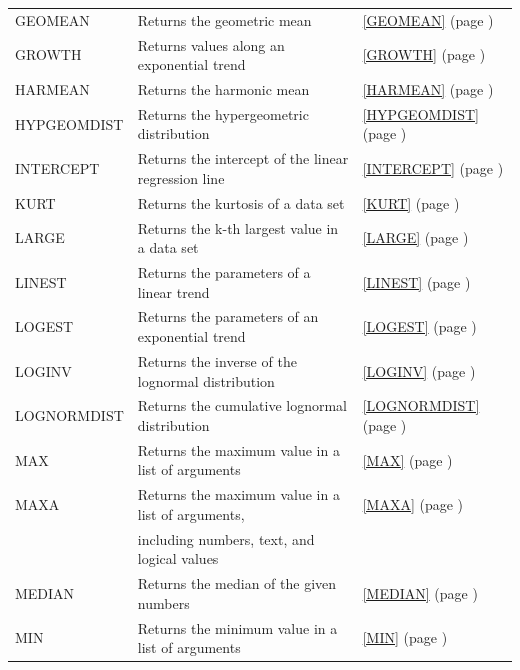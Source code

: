 \begin{center}
\begin{longtable}{l l l }
		GEOMEAN & Returns the geometric mean &  \ref{GEOMEAN} (page \pageref{GEOMEAN}) \index{Spreadsheet Functions!GEOMEAN} \\
		GROWTH & Returns values along an exponential trend &  \ref{GROWTH} (page \pageref{GROWTH}) \index{Spreadsheet Functions!GROWTH} \\
		HARMEAN & Returns the harmonic mean &  \ref{HARMEAN} (page \pageref{HARMEAN}) \index{Spreadsheet Functions!HARMEAN} \\
		HYPGEOMDIST & Returns the hypergeometric distribution &  \ref{HYPGEOMDIST} (page \pageref{HYPGEOMDIST}) \index{Spreadsheet Functions!HYPGEOMDIST} \\
		INTERCEPT & Returns the intercept of the linear regression line &  \ref{INTERCEPT} (page \pageref{INTERCEPT}) \index{Spreadsheet Functions!INTERCEPT} \\
		KURT  & Returns the kurtosis of a data set &  \ref{KURT} (page \pageref{KURT}) \index{Spreadsheet Functions!KURT} \\
		LARGE & Returns the k-th largest value in a data set &  \ref{LARGE} (page \pageref{LARGE}) \index{Spreadsheet Functions!LARGE} \\
		LINEST & Returns the parameters of a linear trend &  \ref{LINEST} (page \pageref{LINEST}) \index{Spreadsheet Functions!LINEST} \\
		LOGEST & Returns the parameters of an exponential trend &  \ref{LOGEST} (page \pageref{LOGEST}) \index{Spreadsheet Functions!LOGEST} \\
		LOGINV & Returns the inverse of the lognormal distribution &  \ref{LOGINV} (page \pageref{LOGINV}) \index{Spreadsheet Functions!LOGINV} \\
		LOGNORMDIST & Returns the cumulative lognormal distribution &  \ref{LOGNORMDIST} (page \pageref{LOGNORMDIST}) \index{Spreadsheet Functions!LOGNORMDIST} \\
		MAX   & Returns the maximum value in a list of arguments &  \ref{MAX} (page \pageref{MAX}) \index{Spreadsheet Functions!MAX} \\
		MAXA  & Returns the maximum value in a list of arguments,  &  \ref{MAXA} (page \pageref{MAXA}) \index{Spreadsheet Functions!MAXA} \\
		& including numbers, text, and logical values &   \\
		MEDIAN & Returns the median of the given numbers &  \ref{MEDIAN} (page \pageref{MEDIAN}) \index{Spreadsheet Functions!MEDIAN} \\
		MIN   & Returns the minimum value in a list of arguments &  \ref{MIN} (page \pageref{MIN}) \index{Spreadsheet Functions!MIN} \\

\end{longtable}
\end{center}
